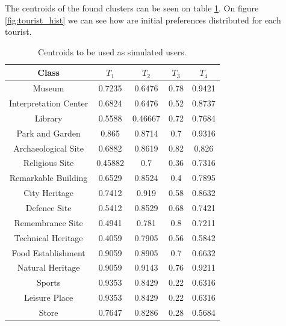 The centroids of the found clusters can be seen on table \ref{table:centroids}. On figure \ref{fig:tourist_hist} we can see how are initial preferences distributed for each tourist.
\begin{table}[h!]
\centering
\begin{tabular}{ |c|c|c|c|c| } 
    \hline
    Class & $T_1$ & $T_2$ & $T_3$ & $T_4$ \\
    \hline
    \hline

    Museum & 0.7235 & 0.6476 & 0.78 & 0.9421 \\ 
    \hline
    Interpretation Center & 0.6824 & 0.6476 & 0.52 & 0.8737 \\
    \hline
    Library & 0.5588 & 0.46667 & 0.72 & 0.7684 \\
    \hline
    Park and Garden & 0.865 & 0.8714 & 0.7 & 0.9316 \\
    \hline
    Archaeological Site & 0.6882 & 0.8619 & 0.82 & 0.826 \\
    \hline
    Religious Site & 0.45882 & 0.7 & 0.36 & 0.7316 \\
    \hline
    Remarkable Building & 0.6529 & 0.8524 & 0.4 & 0.7895 \\
    \hline
    City Heritage & 0.7412 & 0.919 & 0.58 & 0.8632 \\
    \hline
    Defence Site & 0.5412 & 0.8529 & 0.68 & 0.7421 \\
    \hline
    Remembrance Site & 0.4941 & 0.781 & 0.8 & 0.7211 \\
    \hline
    Technical Heritage & 0.4059 & 0.7905 & 0.56 & 0.5842 \\
    \hline
    Food Establishment & 0.9059 & 0.8905 & 0.7 & 0.6632 \\
    \hline
    Natural Heritage & 0.9059 & 0.9143 & 0.76 & 0.9211 \\
    \hline
    Sports & 0.9353 & 0.8429 & 0.22 & 0.6316 \\
    \hline
    Leisure Place & 0.9353 & 0.8429 & 0.22 & 0.6316 \\
    \hline
    Store & 0.7647 & 0.8286 & 0.28 & 0.5684 \\
    
    \hline
\end{tabular}
\caption{Centroids to be used as simulated users.}
\label{table:centroids}
\end{table}

